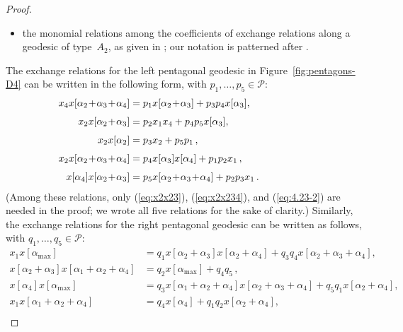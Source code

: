 \documentclass[letterpaper]{amsart}
\numberwithin{equation}{section}
\theoremstyle{definition}
\begin{document}
\begin{proof}
\begin{itemize}
\item 
the monomial relations among the coefficients of exchange relations 
along a geodesic of type~$A_2$, as given in 
\cite[(6.11)]{fz-clust1}; 
our notation is patterned after \cite[Figure~3]{fz-clust1}. 
\end{itemize} 
The exchange relations for the left pentagonal geodesic 
in Figure~\ref{fig:pentagons-D4} can be written in the following form, 
with $p_1,\dots,p_5\in\mathcal{P}$: 
\begin{align} 
\nonumber 
x_4 x[\alpha_2\!+\!\alpha_3\!+\!\alpha_4] 
&= p_1 x[\alpha_2\!+\!\alpha_3] + p_3 p_4 x[\alpha_3], 
\\[.05in] 
\label{eq:x2x23} 
x_2 x[\alpha_2\!+\!\alpha_3] 
&=p_2 x_1x_4 + p_4 p_5 x[\alpha_3], 
\\[.05in] 
\nonumber 
x_2 x[\alpha_2] 
&=p_3 x_2 + p_5 p_1\,, 
\\[.05in] 
\label{eq:x2x234} 
x_2 x[\alpha_2\!+\!\alpha_3\!+\!\alpha_4] 
&= p_4 x[\alpha_3]x[\alpha_4]+ p_1 p_2 x_1\,, 
\\[.05in] 
\label{eq:4.23-2} 
x[\alpha_4] x[\alpha_2\!+\!\alpha_3] 
&= p_5 x[\alpha_2\!+\!\alpha_3\!+\!\alpha_4] + p_2 p_3 x_1\,.  \hspace{.7in} 
\end{align} 
(Among these relations, only 
(\ref{eq:x2x23}), (\ref{eq:x2x234}), and (\ref{eq:4.23-2}) 
are needed in the proof; 
we wrote all five relations for the sake of clarity.) 
% 
Similarly, the 
exchange relations for the right pentagonal geodesic can 
be written as follows, with $q_1,\dots,q_5\in\mathcal{P}$: 
\begin{align} 
\label{eq:x1x-max} 
x_1 x[\alpha_{\max}] &=q_1  x[\alpha_2\!+\!\alpha_3]x[\alpha_2\!+\!\alpha_4] 
+q_3 q_4 x[\alpha_2\!+\!\alpha_3\!+\!\alpha_4], 
\\[.05in] 
\nonumber 
x[\alpha_2\!+\!\alpha_3]x[\alpha_1\!+\!\alpha_2\!+\!\alpha_4] 
&=q_2 x[\alpha_{\max}] + q_4 q_5\,, 
\\[.05in] 
\nonumber 
x[\alpha_4] x[\alpha_{\max}] 
&= q_3 
x[\alpha_1\!+\!\alpha_2\!+\!\alpha_4]x[\alpha_2\!+\!\alpha_3\!+\!\alpha_4] 
+ q_5 q_1 x[\alpha_2+\alpha_4], 
\\[.05in] 
\label{eq:1-1234} 
x_1 x[\alpha_1\!+\!\alpha_2\!+\!\alpha_4] 
&=q_4 x[\alpha_4] + q_1 q_2 x[\alpha_2\!+\!\alpha_4], 
\\[.05in] 
\label{eq:4.23-1} 

\end{align}
\end{proof}
\end{document}
